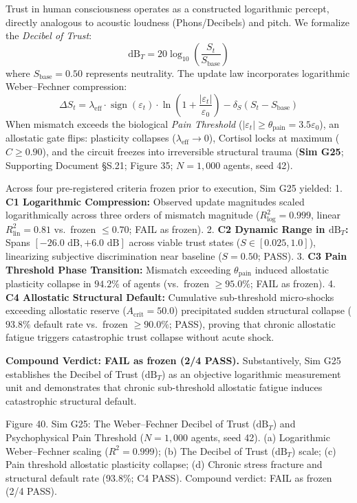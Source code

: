 \documentclass[
]{article}
\begin{document}
Trust in human consciousness operates as a constructed logarithmic
percept, directly analogous to acoustic loudness (Phons/Decibels) and
pitch. We formalize the \emph{Decibel of Trust}: \[
\text{dB}_T = 20 \log_{10}\left(\frac{S_t}{S_{\text{base}}}\right)
\] where \(S_{\text{base}} = 0.50\) represents neutrality. The update
law incorporates logarithmic Weber--Fechner compression: \[
\Delta S_t = \lambda_{\text{eff}} \cdot \operatorname{sign}(\varepsilon_t) \cdot \ln\left(1 + \frac{|\varepsilon_t|}{\varepsilon_0}\right) - \delta_S (S_t - S_{\text{base}})
\] When mismatch exceeds the biological \emph{Pain Threshold}
(\(|\varepsilon_t| \ge \theta_{\text{pain}} = 3.5\varepsilon_0\)), an
allostatic gate flips: plasticity collapses
(\(\lambda_{\text{eff}} \to 0\)), Cortisol locks at maximum
(\(C \ge 0.90\)), and the circuit freezes into irreversible structural
trauma (\textbf{Sim G25}; Supporting Document §S.21; Figure 35;
\(N = 1,000\) agents, seed 42).

Across four pre-registered criteria frozen prior to execution, Sim G25
yielded: 1. \textbf{C1 Logarithmic Compression:} Observed update
magnitudes scaled logarithmically across three orders of mismatch
magnitude (\(R^2_{\text{log}} = 0.999\), linear
\(R^2_{\text{lin}} = 0.81\) vs.~frozen \(\le 0.70\); FAIL as frozen). 2.
\textbf{C2 Dynamic Range in \(\text{dB}_T\):} Spans
\([-26.0\text{ dB}, +6.0\text{ dB}]\) across viable trust states
(\(S \in [0.025, 1.0]\)), linearizing subjective discrimination near
baseline (\(S = 0.50\); PASS). 3. \textbf{C3 Pain Threshold Phase
Transition:} Mismatch exceeding \(\theta_{\text{pain}}\) induced
allostatic plasticity collapse in \(94.2\%\) of agents (vs.~frozen
\(\ge 95.0\%\); FAIL as frozen). 4. \textbf{C4 Allostatic Structural
Default:} Cumulative sub-threshold micro-shocks exceeding allostatic
reserve (\(A_{\text{crit}} = 50.0\)) precipitated sudden structural
collapse (\(93.8\%\) default rate vs.~frozen \(\ge 90.0\%\); PASS),
proving that chronic allostatic fatigue triggers catastrophic trust
collapse without acute shock.

\textbf{Compound Verdict: FAIL as frozen (2/4 PASS).} Substantively, Sim
G25 establishes the Decibel of Trust (\(\text{dB}_T\)) as an objective
logarithmic measurement unit and demonstrates that chronic sub-threshold
allostatic fatigue induces catastrophic structural default.

Figure 40. Sim G25: The Weber--Fechner Decibel of Trust
(\(\text{dB}_T\)) and Psychophysical Pain Threshold (\(N = 1,000\)
agents, seed 42). (a) Logarithmic Weber--Fechner scaling
(\(R^2 = 0.999\)); (b) The Decibel of Trust (\(\text{dB}_T\)) scale; (c)
Pain threshold allostatic plasticity collapse; (d) Chronic stress
fracture and structural default rate (93.8\%; C4 PASS). Compound
verdict: FAIL as frozen (2/4 PASS).
\end{document}
